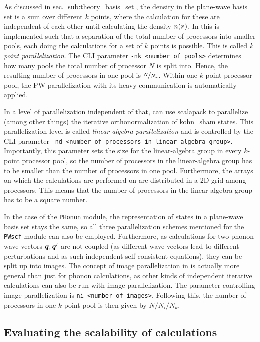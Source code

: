 \documentclass[main.tex]{subfiles}
\begin{document}
As discussed in sec. \ref{sub:theory_basis_set}, the density in the plane-wave basis set is a sum over different \(k\) points, where the calculation for these are independent of each other until calculating the density \(n( \vb*{r})\).
In \QE this is implemented such that a separation of the total number of processors into smaller pools, each doing the calculations for a set of \(k\) points is possible.
This is called \emph{k point parallelization}.
The CLI parameter \texttt{-nk <number of pools>} determines how many pools the total number of processor \(N\) is split into.
Hence, the resulting number of processors in one pool is \(\nicefrac{N}{N_k}\).
Within one \(k\)-point processor pool, the PW parallelization with its heavy communication is automatically applied.

In a level of parallelization independent of that, \QE can use \gls{scalapack} to parallelize (among other things) the iterative orthonormalization of \acrshort{kohn_sham} states.
This parallelization level is called \emph{linear-algebra parallelization} and is controlled by the CLI parameter \texttt{-nd <number of processors in linear-algebra group>}.
Importantly, this parameter sets the size for the linear-algebra group in every \(k\)-point processor pool, so the number of processors in the linear-algebra group has to be smaller than the number of processors in one pool.
Furthermore, the arrays on which the calculations are performed on are distributed in a 2D grid among processors.
This means that the number of processors in the linear-algebra group has to be a square number.

In the case of the \texttt{PHonon} module, the representation of states in a plane-wave basis set stays the same, so all three parallelization schemes mentioned for the \texttt{PWscf} module can also be employed.
Furthermore, as calculations for two phonon wave vectors \(\vb*{q}, \vb*{q}^{\prime}\) are not coupled (as different wave vectors lead to different perturbations and as such independent self-consistent equations), they can be split up into images.
The concept of image parallelization in \QE is actually more general than just for phonon calculations, as other kinds of independent iterative calculations can also be run with image parallelization.
The parameter controlling image parallelization is \texttt{ni <number of images>}.
Following this, the number of processors in one \(k\)-point pool is then given by \(N / N_i / N_k\).

\subsection{Evaluating the scalability of \QE calculations}\label{sub:scalability_qe}
\end{document}
